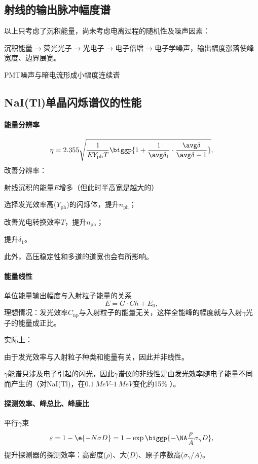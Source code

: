 \subsection{\textgamma 射线的输出脉冲幅度谱}

以上只考虑了沉积能量，尚未考虑电离过程的随机性及噪声因素：
\begin{compactitem}
	\item 沉积能量$\to$荧光光子$\to$光电子$\to$电子倍增$\to$电子学噪声，输出幅度涨落使峰宽度、边界展宽。
	\item PMT噪声与暗电流形成小幅度连续谱
\end{compactitem}

\subsection{NaI(Tl)单晶闪烁谱仪的性能}

\paragraph{能量分辨率}
\[
	\eta=2.355\sqrt{\frac1{EY_{\mathrm{ph}}T}\biggp{1+\frac1{\avg\delta_1}\cdot\frac{\avg\delta}{\avg\delta-1}}},
\]
改善分辨率：
\begin{compactenum}
	\item 射线沉积的能量$E$增多（但此时半高宽是越大的）
	\item 选择发光效率高($Y_{\mathrm{ph}}$)的闪烁体，提升$n_{\mathrm{ph}}$；
	\item 改善光电转换效率$T$，提升$n_{\mathrm{ph}}$；
	\item 提升$\delta_1$。
\end{compactenum}
此外，高压稳定性和多道的道宽也会有所影响。
\paragraph{能量线性}单位能量输出幅度与入射粒子能量的关系
\[
	E=G\cdot Ch+E_0,
\]
理想情况：发光效率$C_{\mathrm{np}}$与入射粒子的能量无关，这样全能峰的幅度就与入射$\gamma$光子的能量成正比。

实际上：
\begin{compactitem}
	\item 由于发光效率与入射粒子种类和能量有关，因此并非线性。
	\item $\gamma$能谱只涉及电子引起的闪光，因此$\gamma$谱仪的非线性是由发光效率随电子能量不同而产生的（对NaI(Tl)，在$\SIrange{0.1}{1}{MeV}$变化约15\% ）。
\end{compactitem}
\paragraph{探测效率、峰总比、峰康比}平行$\gamma$束
\[
	\varepsilon=1-\e{-N\sigma D}=1-\exp\biggp{-\NA\frac\rho{A}\sigma_\gamma D},
\]
提升探测器的探测效率：高密度($\rho$)、大($D$)、原子序数高($\sigma_\gamma/A$)。

